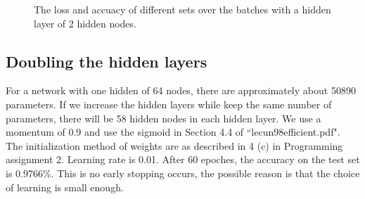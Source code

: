 \documentclass{article} %
\begin{document}
\begin{figure} [!htbp]
	
	\caption{The loss and accuacy of different sets over the batches with a hidden layer of 2 hidden nodes. }  
\end{figure}



\subsection{Doubling the hidden layers}
For a network with one hidden of 64 nodes, there are approximately about 50890 parameters. If we increase the hidden layers while keep the same number of parameters, there will be 58 hidden nodes in each hidden layer. We use a momentum of 0.9 and use the sigmoid in Section 4.4 of ``lecun98efficient.pdf". The initialization method of weights are as described in 4 (c) in Programming assignment 2. Learning rate is 0.01. After 60 epoches, the accuracy on the test set is 0.9766\%. This is no early stopping occurs, the possible reason is that the choice of learning is small enough.
\end{document}
